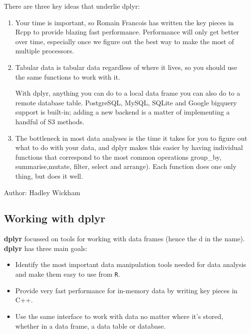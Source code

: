 \documentclass{article}
\begin{document}
	\begin{framed}
	
	
	\noindent There are three key ideas that underlie dplyr:
	
	\begin{enumerate}
	\item Your time is important, so Romain Francois has written the key pieces in Rcpp to provide blazing fast performance. Performance will only get better over time, especially once we figure out the best way to make the most of multiple processors. 

	\item Tabular data is tabular data regardless of where it lives, so you should use the same functions to work with it. 
	
	With dplyr, anything you can do to a local data frame you can also do to a remote database table. PostgreSQL, MySQL, SQLite and Google bigquery support is built-in; adding a new backend is a matter of implementing a handful of S3 methods. 

	\item The bottleneck in most data analyses is the time it takes for you to figure out what to do with your data, and dplyr makes this easier by having individual functions that correspond to the most common operations  group\_by, summarise,mutate, filter, select and arrange). Each function does one only thing, but does it well.
	\end{enumerate}
	Author: Hadley Wickham
    \end{framed}


\subsection{Working with dplyr} \textbf{dplyr} focussed on tools for working with data frames (hence the d in the name). \textbf{dplyr} has three main goals:


\begin{itemize}
\item Identify the most important data manipulation tools needed for data analysis and make them easy to use from \texttt{R}.

\item Provide very fast performance for in-memory data by writing key pieces in C++.

\item Use the same interface to work with data no matter where it's stored, whether in a data frame, a data table or database.
\end{itemize}
\end{document}
